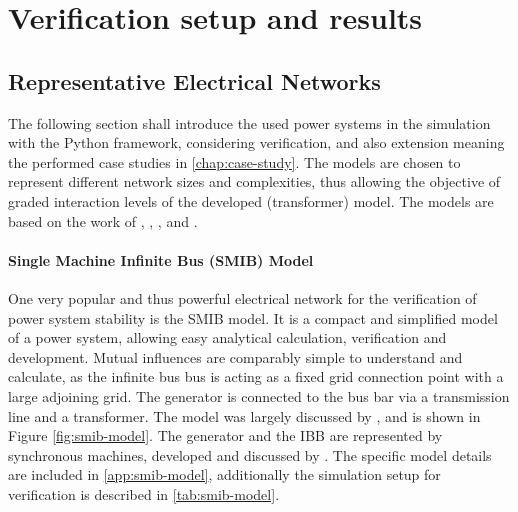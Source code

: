 


\chapter{Verification setup and results}


\section{Representative Electrical Networks}

The following section shall introduce the used power systems in the simulation with the Python framework, considering verification, and also extension meaning the performed case studies in \autoref{chap:case-study}. The models are chosen to represent different network sizes and complexities, thus allowing the objective of graded interaction levels of the developed (transformer) model. The models are based on the work of \textcite{machowskiPowerSystemDynamics2020}, \textcite{kundurPowerSystemStability2022}, \textcite{IEEEGuideLoad2022}, and \textcite{vancutsemTestSystemsVoltage2020}.

\subsubsection{Single Machine Infinite Bus (SMIB) Model}

One very popular and thus powerful electrical network for the verification of power system stability is the \acs{SMIB} model. It is a compact and simplified model of a power system, allowing easy analytical calculation, verification and development. Mutual influences are comparably simple to understand and calculate, as the infinite bus bus is acting as a fixed grid connection point with a large adjoining grid. The generator is connected to the bus bar via a transmission line and a transformer. The model was largely discussed by \textcite{kundurPowerSystemStability2022}, and is shown in Figure \ref{fig:smib-model}. The generator and the \acs{IBB} are represented by synchronous machines, developed and discussed by \textcite{kordowichPhysicsInformedMachine2023}. The specific model details are included in \autoref{app:smib-model}, additionally the simulation setup for verification is described in \autoref{tab:smib-model}.

